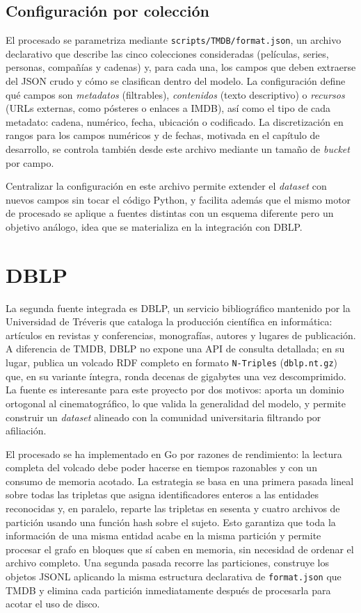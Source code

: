 \subsection*{Configuración por colección}

El procesado se parametriza mediante \texttt{scripts/TMDB/format.json},
un archivo declarativo que describe las cinco colecciones consideradas
(películas, series, personas, compañías y cadenas) y, para cada una,
los campos que deben extraerse del JSON crudo y cómo se clasifican
dentro del modelo. La configuración define qué campos son
\emph{metadatos} (filtrables), \emph{contenidos} (texto descriptivo) o
\emph{recursos} (URLs externas, como pósteres o enlaces a IMDB), así
como el tipo de cada metadato: cadena, numérico, fecha, ubicación o
codificado. La discretización en rangos para los campos numéricos y de
fechas, motivada en el capítulo de desarrollo, se controla también
desde este archivo mediante un tamaño de \textit{bucket} por campo.

Centralizar la configuración en este archivo permite extender el
\textit{dataset} con nuevos campos sin tocar el código Python, y facilita además
que el mismo motor de procesado se aplique a fuentes distintas con un
esquema diferente pero un objetivo análogo, idea que se materializa en
la integración con DBLP.

\section{DBLP}

La segunda fuente integrada es DBLP, un servicio bibliográfico mantenido
por la Universidad de Tréveris que cataloga la producción científica en
informática: artículos en revistas y conferencias, monografías, autores
y lugares de publicación. A diferencia de TMDB, DBLP no expone una API
de consulta detallada; en su lugar, publica un volcado RDF completo en
formato \texttt{N-Triples} (\texttt{dblp.nt.gz}) que, en su variante
íntegra, ronda decenas de gigabytes una vez descomprimido. La fuente es
interesante para este proyecto por dos motivos: aporta un dominio
ortogonal al cinematográfico, lo que valida la generalidad del modelo,
y permite construir un \textit{dataset} alineado con la comunidad universitaria
filtrando por afiliación.

El procesado se ha implementado en Go por razones de rendimiento: la
lectura completa del volcado debe poder hacerse en tiempos razonables y
con un consumo de memoria acotado. La estrategia se basa en una
primera pasada lineal sobre todas las tripletas que asigna
identificadores enteros a las entidades reconocidas y, en paralelo,
reparte las tripletas en sesenta y cuatro archivos de partición usando
una función hash sobre el sujeto. Esto garantiza que toda la
información de una misma entidad acabe en la misma partición y permite
procesar el grafo en bloques que sí caben en memoria, sin necesidad de
ordenar el archivo completo. Una segunda pasada recorre las
particiones, construye los objetos JSONL aplicando la misma estructura
declarativa de \texttt{format.json} que TMDB y elimina cada partición
inmediatamente después de procesarla para acotar el uso de disco.

